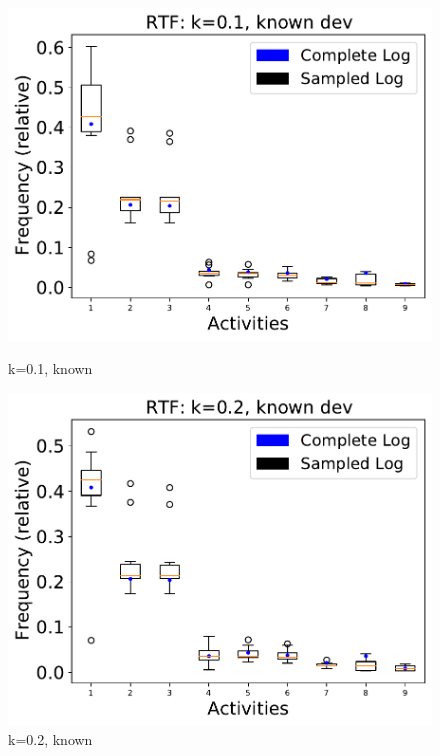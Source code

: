 \documentclass[landscape]{article}
\begin{document}
\begin{figure}[!htb]
	\centering
	\begin{minipage}{0.2\textwidth}
		\includegraphics[width=1.0\textwidth]{../Road_Traffic_Fines_Management_Process/Road_Traffic_Fines_Management_Process_deviationsApprox_0.1_NONALIGNING_KNOWN.pdf}
		\caption{k=0.1, known}
	\end{minipage}
	\hfill
	\begin{minipage}{0.2\textwidth}
		\includegraphics[width=1.0\textwidth]{../Road_Traffic_Fines_Management_Process/Road_Traffic_Fines_Management_Process_deviationsApprox_0.2_NONALIGNING_KNOWN.pdf}
		\caption{k=0.2, known}

\end{minipage}
\end{figure}
\end{document}
